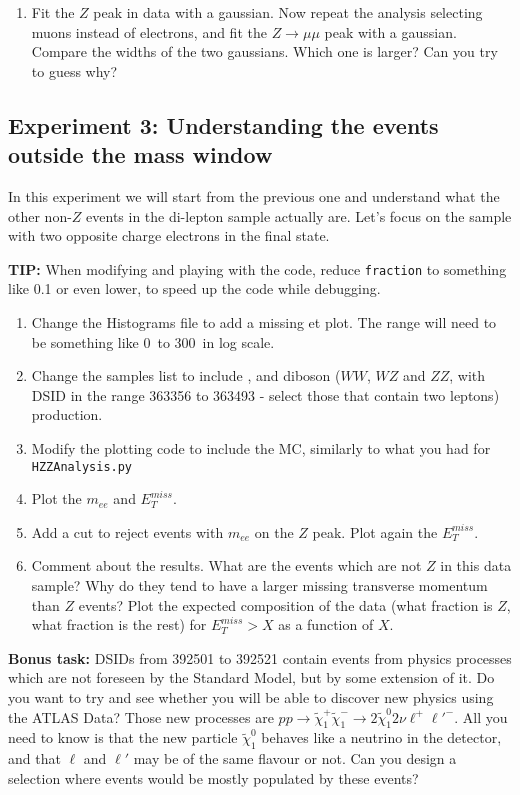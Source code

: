 \begin{enumerate} [resume]
\item Fit the $Z$ peak in data with a gaussian. Now repeat the analysis selecting muons instead of electrons, and fit the $Z\rightarrow \mu\mu$ peak with a gaussian. Compare the widths of the two gaussians. Which one is larger? Can you try to guess why?  
\end{enumerate}

\subsection{Experiment 3: Understanding the events outside the mass window}

In this experiment we will start from the previous one and understand what the other non-$Z$ events in the di-lepton sample actually are. Let's focus on the sample with two opposite charge electrons in the final state. 

\begin{remark}
\textbf{TIP:} When modifying and playing with the code, reduce \verb|fraction| to something like 0.1 or even lower, to speed up the code while debugging.
\end{remark}


\begin{enumerate} 
\item Change the Histograms file to add a missing et plot. The range will need to be something like 0\ \GeV to 300\ \GeV in log scale. 
\item Change the samples list to include \ttbar, and diboson ($WW$, $WZ$ and $ZZ$, with DSID in the range 363356 to 363493 - select those that contain two leptons) production.   
\item Modify the plotting code to include the MC, similarly to what you had for \verb|HZZAnalysis.py|
\item Plot the $m_{ee}$ and $E_{T}^{miss}$.
\item Add a cut to reject events with $m_{ee}$ on the $Z$ peak. Plot again the $E_{T}^{miss}$. 
\item Comment about the results. What are the events which are not $Z$ in this data sample? Why do they tend to have a larger missing transverse momentum than $Z$ events?  Plot the expected composition of the data (what fraction is $Z$, what fraction is the rest) for $ E_{T}^{miss} > X$ as a function of $X$.
\end{enumerate}


\textbf{Bonus task:} DSIDs from 392501 to 392521 contain events from physics processes which are not foreseen by the Standard Model, but by some extension of it. Do you want to try and see whether you will be able to discover new physics using the ATLAS Data? Those new processes are $pp\rightarrow \tilde{\chi}^+_1  \tilde{\chi}^-_1 \rightarrow 2\tilde{\chi}^0_1 2\nu \ell^+\ell'^-$. All you need to know is that the new particle $\tilde{\chi}^0_1$ behaves like a neutrino in the detector, and that $\ell$ and $\ell'$ may be of the same flavour or not. Can you design a selection where events would be mostly populated by these events? 



